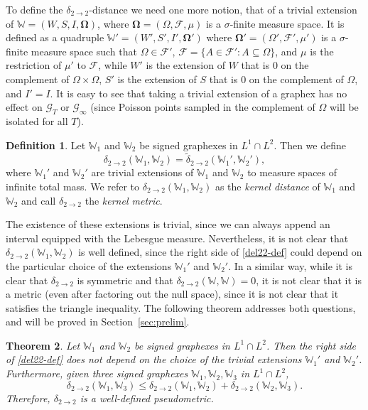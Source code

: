 \documentclass{amsart}
\numberwithin{equation}{section}
\numberwithin{figure}{section}
\newtheorem{theorem}{Theorem}[section]
\theoremstyle{definition}
\newtheorem{definition}[theorem]{Definition}
\theoremstyle{remark}
\newcommand{\bOmega}{{\mathbf{\Omega}}}
\newcommand{\cW}{\mathbb{W}}
\newcommand{\cF}{\mathcal{F}}
\newcommand{\cG}{\mathcal{G}}
\newcommand{\deltt}{\delta_{2\to 2}}
\def\tdel22{{\widetilde{\delta}}_{2\to 2}}
\begin{document}
To define the $\deltt$-distance we need one more notion, that of a trivial
extension of $\cW=(W,S,I,\bOmega)$, where $\bOmega=(\Omega,\cF,\mu)$ is a
$\sigma$-finite measure space. It is defined as a quadruple
$\cW'=(W',S',I',\bOmega')$ where $\bOmega'=(\Omega',\cF',\mu')$ is a
$\sigma$-finite measure space such that $\Omega\in \cF'$, $\cF=\{A\in \cF' :
A\subseteq \Omega\}$, and $\mu$ is the restriction of $\mu'$ to $\cF$, while
$W'$ is the extension of $W$ that is $0$ on the complement of
$\Omega\times\Omega$, $S'$ is the extension of $S$ that is $0$ on the
complement of $\Omega$, and $I'=I$. It is easy to see that taking a trivial
extension of a graphex has no effect on $\cG_T$ or $\cG_\infty$ (since
Poisson points sampled in the complement of $\Omega$ will be isolated for all
$T$).

\begin{definition}\label{def:del22}
Let $\cW_1$ and $\cW_2$ be signed graphexes in $L^1\cap L^2$. Then we define
\begin{equation}\label{del22-def}
\deltt(\cW_1,\cW_2)=
\tdel22(\cW_1',\cW_2'),
\end{equation}
where $\cW_1'$ and $\cW_2'$ are trivial extensions of $\cW_1$ and $\cW_2$ to
measure spaces of infinite total mass. We refer to $\deltt(\cW_1,\cW_2) $ as
the \emph{kernel distance} of $\cW_1$ and $\cW_2$ and call $\deltt$ the
\emph{kernel metric}.
\end{definition}

The existence of these extensions is trivial, since we can always append an
interval equipped with the Lebesgue measure. Nevertheless, it is not clear
that $\deltt(\cW_1,\cW_2)$ is well defined, since the right side of
\eqref{del22-def} could depend on the particular choice of the extensions
$\cW_1'$ and $\cW_2'$. In a similar way, while it is clear that $\deltt$ is
symmetric and that $\deltt(\cW,\cW)=0$, it is not clear that it is a metric
(even after factoring out the null space), since it is not clear that it
satisfies the triangle inequality. The following theorem addresses both
questions, and will be proved in Section~\ref{sec:prelim}.

\begin{theorem} \label{thm:deltt-metric}
Let $\cW_1$ and $\cW_2$ be signed graphexes in $L^1\cap L^2$. Then the right
side of \eqref{del22-def} does not depend on the choice of the trivial
extensions $\cW_1'$ and $\cW_2'$. Furthermore, given three signed graphexes
$\cW_1,\cW_2,\cW_3$ in $L^1\cap L^2$,
\[
\deltt(\cW_1,\cW_3) \le \deltt(\cW_1,\cW_2)+\deltt(\cW_2,\cW_3)
.
\]
Therefore, $\deltt$ is a well-defined pseudometric.
\end{theorem}
\end{document}
